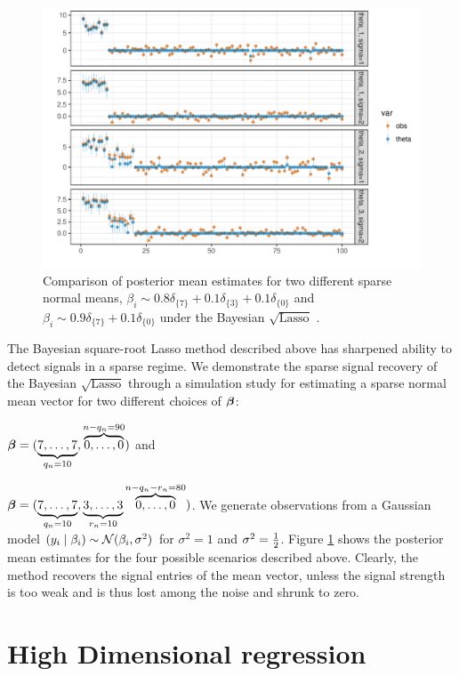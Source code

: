 \documentclass[chapters]{uamaththesis}
\begin{document}
\begin{figure}[!ht]%
\centering
\includegraphics[width=\columnwidth]{art/sparse-means-sql-1}%
\caption{Comparison of posterior mean estimates for two different sparse normal means, $\beta_i \sim 0.8 \delta_{\{7\}}+0.1\delta_{\{3\}}+0.1\delta_{\{0\}}$ and $\beta_i \sim 0.9 \delta_{\{7\}}+0.1\delta_{\{0\}}$ under the Bayesian $\sqrt{\text{Lasso}}$ . }%
\label{fig:sql-sim-1}%
\end{figure}

The Bayesian square-root Lasso method described above has sharpened ability to detect signals in a sparse regime. We demonstrate the sparse signal recovery of the Bayesian $\sqrt{\text{Lasso}}$ through a simulation study for estimating a sparse normal mean vector for two different choices of $\boldsymbol{\beta}$: 
\ben
\item $\boldsymbol{\beta} = (\underbrace{7,\ldots,7}_{q_n=10},\overbrace{0,\ldots,0}^{n-q_n = 90})$ and 
\item $\boldsymbol{\beta} = (\underbrace{7,\ldots,7}_{q_{n}=10},\underbrace{3,\ldots,3}_{r_n=10}\overbrace{0,\ldots,0}^{n-q_n-r_n = 80})$.
\een
We generate observations from a Gaussian model $(y_i \mid \beta_i) \sim \mathcal{N}(\beta_i, \sigma^2)$ for $\sigma^2 = 1$ and $\sigma^2 = \frac{1}{2}$. Figure \ref{fig:sql-sim-1} shows the posterior mean estimates for the four possible scenarios described above. Clearly, the method recovers the signal entries of the mean vector, unless the signal strength is too weak and is thus lost among the noise and shrunk to zero.

\section{High Dimensional regression}
\end{document}
